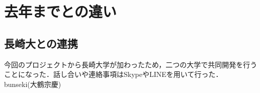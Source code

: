 \section{去年までとの違い}
\subsection{長崎大との連携}
 今回のプロジェクトから長崎大学が加わったため，二つの大学で共同開発を行うことになった．話し合いや連絡事項はSkypeやLINEを用いて行った．
bunseki(大鶴宗慶)
